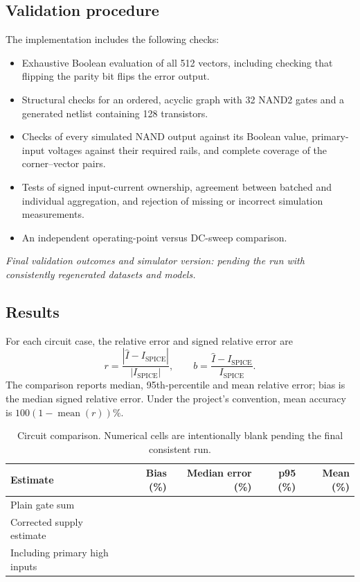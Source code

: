\subsection{Validation procedure}
The implementation includes the following checks:
\begin{itemize}
\item Exhaustive Boolean evaluation of all 512 vectors, including checking
      that flipping the parity bit flips the error output.
\item Structural checks for an ordered, acyclic graph with 32 NAND2 gates
      and a generated netlist containing 128 transistors.
\item Checks of every simulated NAND output against its Boolean value,
      primary-input voltages against their required rails, and complete
      coverage of the corner--vector pairs.
\item Tests of signed input-current ownership, agreement between batched
      and individual aggregation, and rejection of missing or incorrect
      simulation measurements.
\item An independent operating-point versus DC-sweep comparison.
\end{itemize}
\noindent\textit{Final validation outcomes and simulator version: pending
the run with consistently regenerated datasets and models.}

\subsection{Results}
For each circuit case, the relative error and signed relative error are
\begin{equation}
r=\frac{|\widehat I-I_{\mathrm{SPICE}}|}{|I_{\mathrm{SPICE}}|},
\qquad
b=\frac{\widehat I-I_{\mathrm{SPICE}}}{I_{\mathrm{SPICE}}}.
\end{equation}
The comparison reports median, 95th-percentile and mean relative error;
bias is the median signed relative error. Under the project's convention,
mean accuracy is $100(1-\operatorname{mean}(r))\%$.

\begin{table}[H]
\centering\small
\begin{tabular}{lrrrr}
\toprule
Estimate & Bias (\%) & Median error (\%) & p95 (\%) & Mean (\%)\\
\midrule
Plain gate sum & & & & \\
Corrected supply estimate & & & & \\
Including primary high inputs & & & & \\
\bottomrule
\end{tabular}
\caption{Circuit comparison. Numerical cells are intentionally blank pending
the final consistent run.}
\label{tab:circuitresults}
\end{table}

